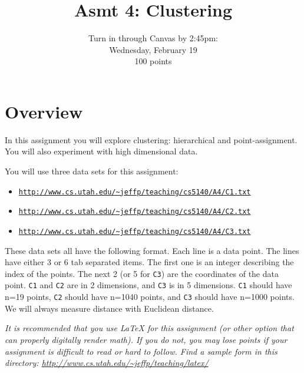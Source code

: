 \documentclass[11pt]{article}
\title{Asmt 4: Clustering}
\author{Turn in through Canvas by 2:45pm: \\
Wednesday, February 19
\\100 points}
\date{}
\begin{document}
\maketitle




\section*{Overview}

In this assignment you will explore clustering: hierarchical and point-assignment.  
You will also experiment with high dimensional data.  

You will use three data sets for this assignment:
\begin{itemize} \denselist
\item \href{http://www.cs.utah.edu/~jeffp/teaching/cs5140/A4/C1.txt}{\texttt{http://www.cs.utah.edu/\~{}jeffp/teaching/cs5140/A4/C1.txt}}
\item \href{http://www.cs.utah.edu/~jeffp/teaching/cs5140/A4/C2.txt}{\texttt{http://www.cs.utah.edu/\~{}jeffp/teaching/cs5140/A4/C2.txt}}
\item \href{http://www.cs.utah.edu/~jeffp/teaching/cs5140/A4/C3.txt}{\texttt{http://www.cs.utah.edu/\~{}jeffp/teaching/cs5140/A4/C3.txt}}
\end{itemize}
These data sets all have the following format.  Each line is a data point.  The lines have either 3 or 6 tab separated items.  The first one is an integer describing the index of the points.  The next 2 (or 5 for \texttt{C3}) are the coordinates of the data point.  \texttt{C1} and \texttt{C2} are in 2 dimensions, and \texttt{C3} is in 5 dimensions.  \texttt{C1} should have n=19 points, \texttt{C2} should have n=1040 points, and \texttt{C3} should have n=1000 points.  
We will always measure distance with Euclidean distance.  


\vspace{.1in}

\emph{It is recommended that you use LaTeX for this assignment (or other option that can properly digitally render math).  If you do not, you may lose points if your assignment is difficult to read or hard to follow.  Find a sample form in this directory:
\url{http://www.cs.utah.edu/~jeffp/teaching/latex/}}


\end{document}
